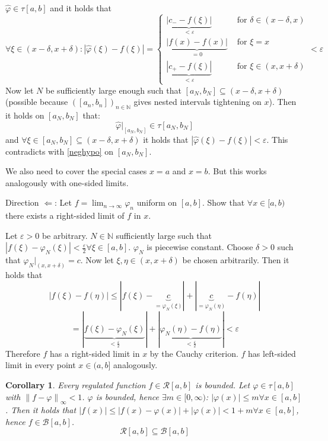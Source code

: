 \documentclass{article}
\newtheorem*{corollary}{Corollary}%
\newcommand{\norm}[1]{\left\|#1\right\|}
\newcommand{\card}[1]{\left|#1\right|}
\begin{document}
\begin{enumerate}
    $\hat{\varphi} \in \tau[a,b]$ and it holds that
    \[
      \forall \xi \in (x - \delta, x + \delta):
      \card{\hat\varphi(\xi) - f(\xi)} = \begin{cases}
        \underbrace{\card{c_- - f(\xi)}}_{< \varepsilon} & \text{ for } \delta \in (x - \delta, x) \\
        \underbrace{\card{f(x) - f(x)}}_{= 0} & \text{ for } \xi = x \\
        \underbrace{\card{c_+ - f(\xi)}}_{< \varepsilon} & \text{ for } \xi \in (x, x + \delta)
      \end{cases} < \varepsilon
    \]
    Now let $N$ be sufficiently large enough such that $[a_N, b_N] \subseteq (x - \delta, x + \delta)$
    (possible because $([a_n, b_n])_{n \in \mathbb N}$ gives nested intervals tightening on $x$).
    Then it holds on $[a_N, b_N]$ that:
    \[ \hat\varphi|_{[a_N, b_N]} \in \tau[a_N, b_N] \]
    and $\forall \xi \in [a_N, b_N] \subseteq (x - \delta, x + \delta)$ it holds that
    $\card{\hat{\varphi}(\xi) - f(\xi)} < \varepsilon$. This contradicts with \eqref{neghypo} on $[a_N, b_N]$.

    We also need to cover the special cases $x = a$ and $x = b$.
    But this works analogously with one-sided limits.

    Direction $\Leftarrow$:
    Let $f = \lim_{n\to\infty} \varphi_n$ uniform on $[a,b]$.
    Show that $\forall x \in [a,b)$ there exists a right-sided limit of $f$ in $x$.

    Let $\varepsilon > 0$ be arbitrary. $N \in \mathbb N$ sufficiently large such that
    $\card{f(\xi) - \varphi_N(\xi)} < \frac\varepsilon2 \forall \xi \in [a,b]$.
    $\varphi_N$ is piecewise constant. Choose $\delta > 0$ such that
    $\varphi_N|_{(x, x+\delta)} = c$.
    Now let $\xi, \eta \in (x, x+\delta)$ be chosen arbitrarily.
    Then it holds that
    \[
      \card{f(\xi) - f(\eta)} \leq \card{f(\xi) - \underbrace{c}_{= \varphi_N(\xi)}} + \card{\underbrace{c}_{= \varphi_N(\eta)} - f(\eta)}
    \] \[
      = \card{\underbrace{f(\xi) - \varphi_N(\xi)}_{< \frac\varepsilon2}} + \card{\underbrace{\varphi_N(\eta) - f(\eta)}_{< \frac\varepsilon2}} < \varepsilon
    \]
    Therefore $f$ has a right-sided limit in $x$ by the Cauchy criterion.
    $f$ has left-sided limit in every point $x \in (a, b]$ analogously.
\end{enumerate}

\begin{corollary}
  Every regulated function $f \in \mathcal R[a,b]$ is bounded.
  Let $\varphi \in \tau[a,b]$ with $\norm{f - \varphi}_{\infty} < 1$.
  $\varphi$ is bounded, hence $\exists m \in [0, \infty)$:
  $\card{\varphi(x)} \leq m \forall x \in [a,b]$.
  Then it holds that $\card{f(x)} \leq \card{f(x) - \varphi(x)} + \card{\varphi(x)} < 1 + m \forall x \in [a,b]$,
  hence $f \in \mathcal B[a,b]$.
  \[ \mathcal R[a,b] \subseteq \mathcal B[a,b] \]
\end{corollary}
\end{document}
